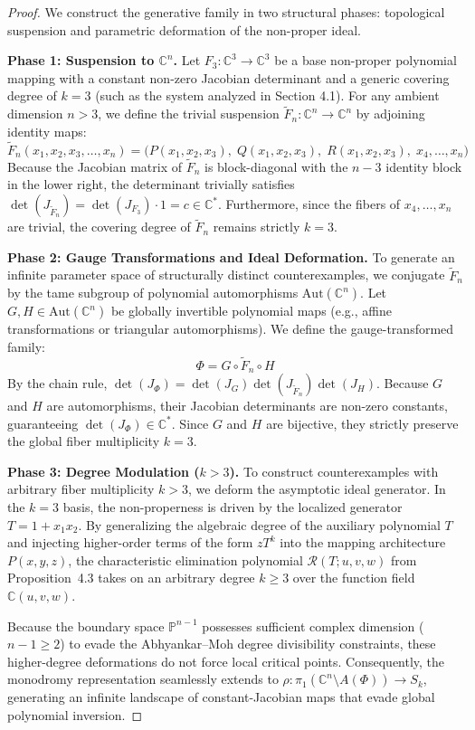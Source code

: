 \documentclass[11pt,reqno]{amsart}
\theoremstyle{definition}
\begin{document}
\begin{proof}
We construct the generative family in two structural phases: topological suspension and parametric deformation of the non-proper ideal.

\textbf{Phase 1: Suspension to $\mathbb{C}^n$.} 
Let $F_3: \mathbb{C}^3 \to \mathbb{C}^3$ be a base non-proper polynomial mapping with a constant non-zero Jacobian determinant and a generic covering degree of $k=3$ (such as the system analyzed in Section 4.1). For any ambient dimension $n > 3$, we define the trivial suspension $\tilde{F}_n: \mathbb{C}^n \to \mathbb{C}^n$ by adjoining identity maps:
$$\tilde{F}_n(x_1, x_2, x_3, \dots, x_n) = \big( P(x_1,x_2,x_3), \; Q(x_1,x_2,x_3), \; R(x_1,x_2,x_3), \; x_4, \dots, x_n \big)$$
Because the Jacobian matrix of $\tilde{F}_n$ is block-diagonal with the $n-3$ identity block in the lower right, the determinant trivially satisfies $\det(J_{\tilde{F}_n}) = \det(J_{F_3}) \cdot 1 = c \in \mathbb{C}^*$. Furthermore, since the fibers of $x_4, \dots, x_n$ are trivial, the covering degree of $\tilde{F}_n$ remains strictly $k=3$.

\textbf{Phase 2: Gauge Transformations and Ideal Deformation.}
To generate an infinite parameter space of structurally distinct counterexamples, we conjugate $\tilde{F}_n$ by the tame subgroup of polynomial automorphisms $\mathrm{Aut}(\mathbb{C}^n)$. Let $G, H \in \mathrm{Aut}(\mathbb{C}^n)$ be globally invertible polynomial maps (e.g., affine transformations or triangular automorphisms). We define the gauge-transformed family:
$$\Phi = G \circ \tilde{F}_n \circ H$$
By the chain rule, $\det(J_\Phi) = \det(J_G) \det(J_{\tilde{F}_n}) \det(J_H)$. Because $G$ and $H$ are automorphisms, their Jacobian determinants are non-zero constants, guaranteeing $\det(J_\Phi) \in \mathbb{C}^*$. Since $G$ and $H$ are bijective, they strictly preserve the global fiber multiplicity $k=3$.

\textbf{Phase 3: Degree Modulation ($k > 3$).}
To construct counterexamples with arbitrary fiber multiplicity $k > 3$, we deform the asymptotic ideal generator. In the $k=3$ basis, the non-properness is driven by the localized generator $T = 1 + x_1 x_2$. By generalizing the algebraic degree of the auxiliary polynomial $T$ and injecting higher-order terms of the form $z T^k$ into the mapping architecture $P(x, y, z)$, the characteristic elimination polynomial $\mathcal{R}(T; u, v, w)$ from Proposition~4.3 takes on an arbitrary degree $k \ge 3$ over the function field $\mathbb{C}(u, v, w)$. 

Because the boundary space $\mathbb{P}^{n-1}$ possesses sufficient complex dimension ($n-1 \ge 2$) to evade the Abhyankar--Moh degree divisibility constraints, these higher-degree deformations do not force local critical points. Consequently, the monodromy representation seamlessly extends to $\rho: \pi_1(\mathbb{C}^n \setminus A(\Phi)) \to S_k$, generating an infinite landscape of constant-Jacobian maps that evade global polynomial inversion.
\end{proof}
\end{document}
